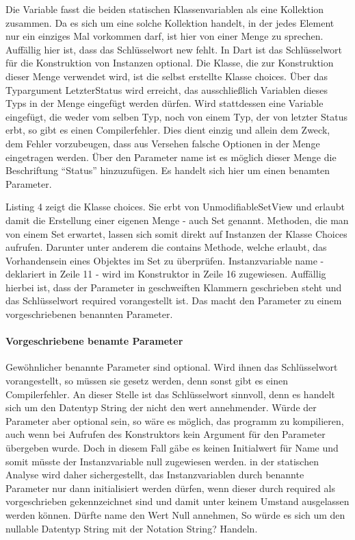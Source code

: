 Die Variable  fasst die beiden statischen Klassenvariablen als eine Kollektion zusammen. Da es sich um eine solche Kollektion handelt, in der jedes Element nur ein einziges Mal vorkommen darf, ist hier von einer Menge zu sprechen. Auffällig hier ist, dass das Schlüsselwort new fehlt. In Dart ist das Schlüsselwort für die Konstruktion von Instanzen optional.  Die Klasse, die zur Konstruktion dieser Menge verwendet wird, ist die selbst erstellte Klasse choices. Über das Typargument LetzterStatus wird erreicht, das ausschließlich Variablen  dieses Typs in der Menge eingefügt werden dürfen. Wird stattdessen eine Variable eingefügt, die weder vom selben Typ, noch von einem Typ, der von letzter Status erbt, so gibt es einen Compilerfehler. Dies dient einzig und allein dem Zweck, dem  Fehler vorzubeugen, dass aus Versehen falsche Optionen in der Menge eingetragen werden. Über den Parameter name ist es möglich dieser Menge die Beschriftung “Status” hinzuzufügen.  Es handelt sich hier um einen  benamten Parameter.

Listing 4 zeigt die Klasse choices. Sie erbt von UnmodifiableSetView und erlaubt damit die Erstellung  einer eigenen Menge - auch Set genannt. Methoden, die man von einem Set erwartet,  lassen sich somit direkt auf  Instanzen der Klasse Choices aufrufen. Darunter unter anderem die contains Methode,  welche erlaubt, das Vorhandensein eines Objektes im Set zu überprüfen.
Instanzvariable name -  deklariert in Zeile 11 - wird im Konstruktor in Zeile 16 zugewiesen. Auffällig hierbei ist, dass der Parameter in geschweiften Klammern geschrieben steht und das Schlüsselwort required  vorangestellt ist. Das macht den Parameter zu einem vorgeschriebenen benannten Parameter.

\paragraph{Vorgeschriebene benamte Parameter}

Gewöhnlicher benannte Parameter sind optional. Wird ihnen das Schlüsselwort  vorangestellt, so müssen sie gesetz werden, denn sonst gibt es einen Compilerfehler.  An dieser Stelle ist das  Schlüsselwort sinnvoll, denn es handelt sich um den Datentyp String der nicht den  wert  annehmender. Würde  der Parameter aber optional sein, so wäre es möglich, das programm zu kompilieren, auch wenn bei Aufrufen des Konstruktors kein Argument für den Parameter übergeben wurde. Doch in diesem Fall gäbe es keinen Initialwert für Name und somit müsste der  Instanzvariable null  zugewiesen werden. in der statischen Analyse wird daher sichergestellt, das Instanzvariablen durch benannte Parameter nur dann initialisiert werden dürfen, wenn dieser durch required  als vorgeschrieben gekennzeichnet sind und damit unter keinem Umstand ausgelassen werden können. Dürfte name den Wert Null annehmen, So würde es sich um den nullable Datentyp String  mit der Notation String? Handeln.


